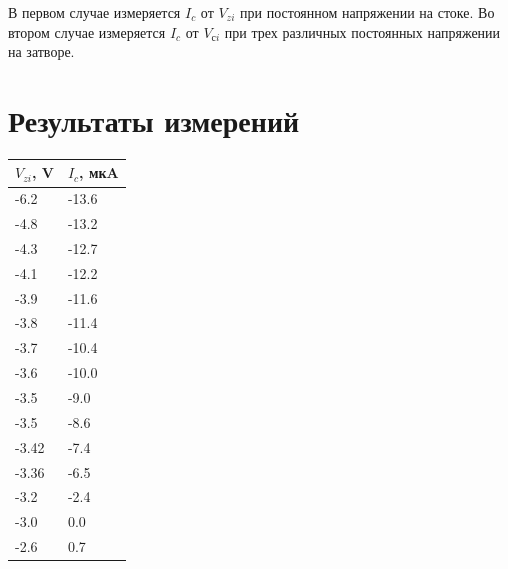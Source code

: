 \documentclass[a4paper,14pt]{article}
\begin{document}
В первом случае измеряется $I_c$ от $V_{zi}$ при постоянном напряжении на стоке.
Во втором случае измеряется $I_c$ от $V_{сi}$ при трех различных постоянных напряжении на затворе.
\section{Результаты измерений}

\begin{table}[H]
	\begin{center}
		\begin{tabular}{|l|l|}
			\hline
			$V_{zi}$, V & $I_c$, мкA \\ \hline
			-6.2	&	-13.6\\ \hline
			-4.8	&	-13.2\\ \hline
			-4.3	&	-12.7\\ \hline
			-4.1	&	-12.2\\ \hline
			-3.9	&	-11.6\\ \hline
			-3.8	&	-11.4\\ \hline
			-3.7	&	-10.4\\ \hline
			-3.6	&	-10.0\\ \hline
			-3.5	&	-9.0\\ \hline
			-3.5	&	-8.6\\ \hline
			-3.42	&	-7.4\\ \hline
			-3.36	&	-6.5\\ \hline
			-3.2	&	-2.4\\ \hline
			-3.0	&	0.0\\ \hline
			-2.6	&	0.7\\ \hline
		\end{tabular}
	\end{center}
\end{table}
\end{document}
